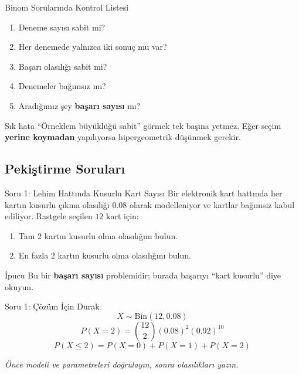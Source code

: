 \documentclass[light]{lutbeamer}
\begin{document}
\begin{frame}{Binom Sorularında Kontrol Listesi}
    \small
    \begin{enumerate}
        \item Deneme sayısı sabit mi?
        \item Her denemede yalnızca iki sonuç mu var?
        \item Başarı olasılığı sabit mi?
        \item Denemeler bağımsız mı?
        \item Aradığımız şey \textbf{başarı sayısı} mı?
    \end{enumerate}

    \begin{alertblock}{Sık hata}
        ``Örneklem büyüklüğü sabit'' görmek tek başına yetmez. Eğer seçim \textbf{yerine koymadan} yapılıyorsa hipergeometrik düşünmek gerekir.
    \end{alertblock}
\end{frame}

\subsection{Pekiştirme Soruları}

\begin{frame}{Soru 1: Lehim Hattında Kusurlu Kart Sayısı}
    \small
    Bir elektronik kart hattında her kartın kusurlu çıkma olasılığı \(0.08\) olarak modelleniyor ve kartlar bağımsız kabul ediliyor. Rastgele seçilen \(12\) kart için:

    \begin{enumerate}
        \item[(a)] Tam \(2\) kartın kusurlu olma olasılığını bulun.
        \item[(b)] En fazla \(2\) kartın kusurlu olma olasılığını bulun.
    \end{enumerate}

    \begin{block}{İpucu}
        Bu bir \textbf{başarı sayısı} problemidir; burada başarıyı ``kart kusurlu'' diye okuyun.
    \end{block}
\end{frame}

\begin{frame}{Soru 1: Çözüm İçin Durak}
    \color{red!70!black}
    \small
    \[
    X \sim \mathrm{Bin}(12,0.08)
    \]
    \[
    P(X=2)=\binom{12}{2}(0.08)^2(0.92)^{10}
    \]
    \[
    P(X\le 2)=P(X=0)+P(X=1)+P(X=2)
    \]

    \begin{center}
        \textit{Önce modeli ve parametreleri doğrulayın, sonra olasılıkları yazın.}
    \end{center}
\end{frame}
\end{document}
